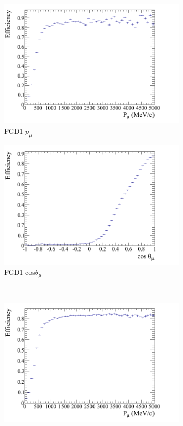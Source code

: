 \begin{figure}
\centering
\begin{subfigure}{.48\textwidth}
  \centering
  \includegraphics[width=0.95\linewidth]{figs/effmomfgd1numu}
  \caption{FGD1 $p_{\mu}$}
\end{subfigure}
\begin{subfigure}{.48\textwidth}
  \centering
  \includegraphics[width=0.95\linewidth]{figs/effcosfgd1numu}
  \caption{FGD1 cos$\theta_{\mu}$}
\end{subfigure} \\
\begin{subfigure}{.48\textwidth}
  \centering
  \includegraphics[width=0.95\linewidth]{figs/effmomfgd2numu}

\end{subfigure}
\end{figure}
